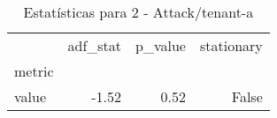 \begin{table}[htbp]
\caption{Estatísticas para 2 - Attack/tenant-a}
\label{tab:2_-_attack_tenant-a_adf_test}
\begin{tabular}{lrrr}
\toprule
 & adf_stat & p_value & stationary \\
metric &  &  &  \\
\midrule
value & -1.52 & 0.52 & False \\
\bottomrule
\end{tabular}
\end{table}
